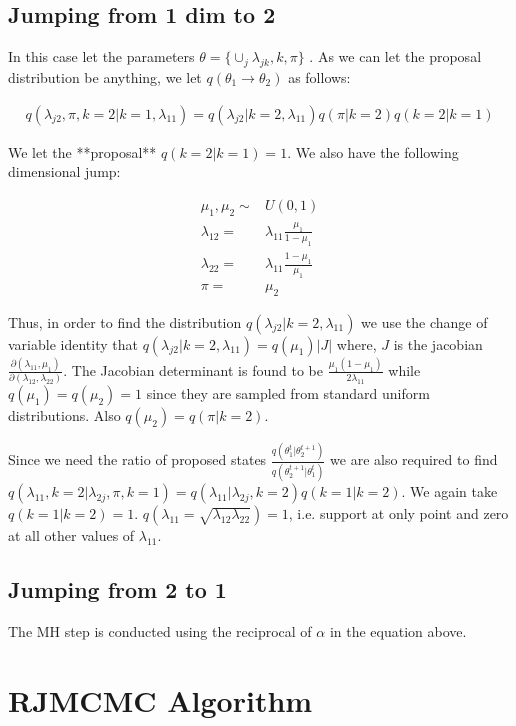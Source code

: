 \documentclass{article}
\begin{document}
\subsection{Jumping from 1 dim to 2}
In this case let the parameters $\theta=\{\cup_j\lambda_{jk},k,\pi\}$ . As we can let the proposal distribution be anything, we let $q(\theta_1\to\theta_2)$ as follows:

\begin{align}
q(\lambda_{j2},\pi,k=2|k=1,\lambda_{11})=q(\lambda_{j2}|k=2,\lambda_{11})q(\pi|k=2)q(k=2|k=1)
\end{align}


We let the **proposal** $q(k=2\vert k=1)=1$. We also have the following dimensional jump:


\begin{align}
\mu_1,\mu_2\sim & U(0,1)\\
\lambda_{12}=&\lambda_{11}\frac{\mu_1}{1-\mu_1}\\
\lambda_{22}=&\lambda_{11}\frac{1-\mu_1}{\mu_1}\\
\pi=&\mu_2
\end{align} 


Thus, in order to find the distribution $q(\lambda_{j2}\vert k=2,\lambda_{11})$ we use the change of variable identity that $q(\lambda_{j2}\vert k=2,\lambda_{11})=q(\mu_1)\vert J\vert$ where, $J$ is the jacobian $\frac{\partial(\lambda_{11},\mu_1)}{\partial(\lambda_{12},\lambda_{22})}$. The Jacobian determinant is found to be $\frac{\mu_1(1-\mu_1)}{2\lambda_{11}}$ while $q(\mu_1)=q(\mu_2)=1$ since they are sampled from standard uniform distributions. Also $q(\mu_2)=q(\pi\vert k=2)$.

Since we need the ratio of proposed states $ \frac{q(\theta_1^t|\theta_2^{t+1})}{q(\theta_2^{t+1}|\theta_1^{t})} $ we are also required to find $ q(\lambda_{11},k=2\vert\lambda_{2j},\pi,k=1) = q(\lambda_{11}\vert\lambda_{2j},k=2) q(k=1 \vert k=2) $. We again take $ q(k=1\vert k=2)=1 $. $q(\lambda_{11}=\sqrt{\lambda_{12}\lambda_{22}})=1$, i.e. support at only point and zero at all other values of $\lambda_{11}$.
 
\subsection{Jumping from 2 to 1}
The MH step is conducted using the reciprocal of $\alpha$ in the equation above.

\section{RJMCMC Algorithm}
\end{document}
